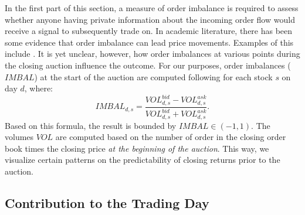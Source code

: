 \documentclass[11pt,a4paper, notitlepage]{article}
\begin{document}
	In the first part of this section, a measure of order imbalance is required to assess whether anyone having private information about the incoming order flow would receive a signal to subsequently trade on. In academic literature, there has been some evidence that order imbalance can lead price movements. Examples of this include \textcite{ChordiaRollSubrahmanyam2008,ChordiaRollSubrahmanyam2005}. It is yet unclear, however, how order imbalances at various points during the closing auction influence the outcome. For our purposes, order imbalances ($IMBAL$) at the start of the auction are computed following \textcite{HoldenJacobsen2014} for each stock $s$ on day $d$, where:
	\[ IMBAL_{d,s} = \frac{VOL^{bid}_{d,s} - VOL^{ask}_{d,s}}{VOL^{bid}_{d,s} + VOL^{ask}_{d,s}}. \]
	Based on this formula, the result is bounded by $IMBAL \in (-1,1)$. The volumes $VOL$ are computed based on the number of order in the closing order book times the closing price \emph{at the beginning of the auction}. This way, we visualize certain patterns on the predictability of closing returns prior to the auction.
	
	\subsection{Contribution to the Trading Day} \label{subsec:OverallDiscovery}
	
\end{document}
